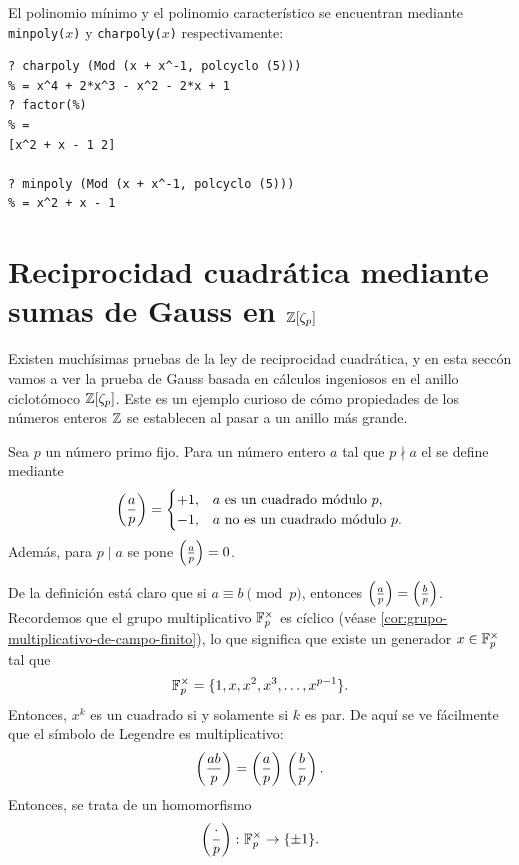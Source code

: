 El polinomio mínimo y el polinomio característico se encuentran mediante
\texttt{minpoly($x$)} y \texttt{charpoly($x$)} respectivamente:
\begin{shaded}
\begin{verbatim}
? charpoly (Mod (x + x^-1, polcyclo (5)))
% = x^4 + 2*x^3 - x^2 - 2*x + 1
? factor(%)
% = 
[x^2 + x - 1 2]

? minpoly (Mod (x + x^-1, polcyclo (5)))
% = x^2 + x - 1
\end{verbatim}
\end{shaded}


\section{Reciprocidad cuadrática mediante sumas de Gauss en \texorpdfstring{$\mathbb{Z} [\zeta_p]$}{ℤ[ζₚ]}}
\label{sec:reciprocidad-cuadratica}


Existen muchísimas pruebas de la ley de reciprocidad cuadrática, y en esta
seccón vamos a ver la prueba de Gauss basada en cálculos ingeniosos en el anillo
ciclotómoco $\mathbb{Z} [\zeta_p]$. Este es un ejemplo curioso de cómo propiedades
de los números enteros $\mathbb{Z}$ se establecen al pasar a un anillo más grande.

\begin{definicion}
  Sea $p$ un número primo fijo. Para un número entero $a$ tal que $p\nmid a$
  el  se define mediante
  \[ \left(\frac{a}{p}\right) = \begin{cases}
    +1, & a\text{ es un cuadrado módulo }p,\\
    -1, & a\text{ no es un cuadrado módulo }p.
  \end{cases} \]
  Además, para $p \mid a$ se pone $\left(\frac{a}{p}\right) = 0$.
\end{definicion}

De la definición está claro que si $a \equiv b \pmod{p}$, entonces
$\left(\frac{a}{p}\right) = \left(\frac{b}{p}\right)$. Recordemos que el grupo multiplicativo
$\mathbb{F}_p^\times$ es cíclico
(véase \ref{cor:grupo-multiplicativo-de-campo-finito}), lo que significa que
existe un generador $x\in \mathbb{F}_p^\times$ tal que
$$\mathbb{F}_p^\times = \{ 1, x, x^2, x^3, \ldots, x^{p-1} \}.$$
Entonces, $x^k$ es un cuadrado si y solamente si $k$ es par.
De aquí se ve fácilmente que el símbolo de Legendre es multiplicativo:
$$\left(\frac{ab}{p}\right) = \left(\frac{a}{p}\right)\,\left(\frac{b}{p}\right).$$
Entonces, se trata de un homomorfismo
$$\left(\frac{\cdot}{p}\right)\colon \mathbb{F}_p^\times \to \{ \pm 1 \}.$$


